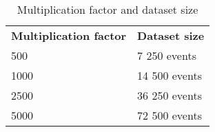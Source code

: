 \begin{table}
  \centering
  \sffamily
  \begin{tabular}{l l}
    \toprule
    \textbf{Multiplication factor} &
    \textbf{Dataset size} \\

    \cline{1-2}

    500 &
    7 250 events \\

    \cline{1-2}

    1000 &
    14 500 events \\

    \cline{1-2}

    2500 &
    36 250 events \\

    \cline{1-2}

    5000 &
    72 500 events \\

    \bottomrule
  \end{tabular}

  \caption{Multiplication factor and dataset size}
  \label{tbl:dataset-size}
\end{table}
